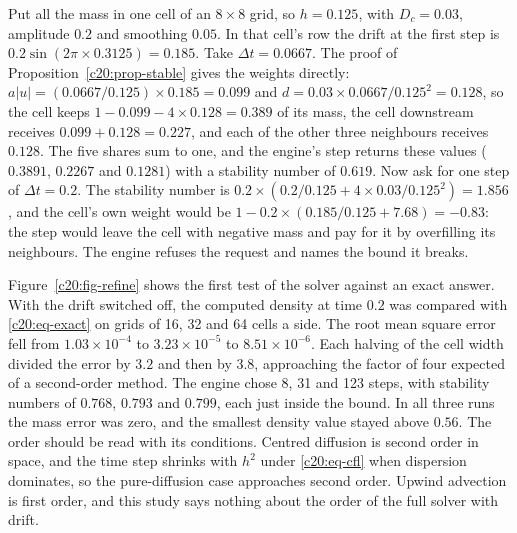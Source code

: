 \begin{example}\label{c20:ex-step}
Put all the mass in one cell of an $8\times8$ grid,
so $h=0.125$, with $D_c=0.03$, amplitude $0.2$ and smoothing $0.05$. In that cell's row the
drift at the first step is $0.2\sin(2\pi\times0.3125)=0.185$. Take $\Delta t=0.0667$. The proof of
Proposition~\ref{c20:prop-stable} gives the weights directly: $a|u|=(0.0667/0.125)\times0.185=0.099$ and
$d=0.03\times0.0667/0.125^2=0.128$, so the cell keeps $1-0.099-4\times0.128=0.389$ of its
mass, the cell downstream receives $0.099+0.128=0.227$, and each of the other three neighbours receives $0.128$. The five shares sum to one, and the engine's step returns these
values ($0.3891$, $0.2267$ and $0.1281$) with a stability number of $0.619$. Now ask for one step of $\Delta t=0.2$. The stability
number is $0.2\times(0.2/0.125+4\times0.03/0.125^2)=1.856$, and the cell's own weight would be
$1-0.2\times(0.185/0.125+7.68)=-0.83$: the step would leave the cell with negative mass
and pay for it by overfilling its neighbours. The engine refuses the request and names the
bound it breaks.
\end{example}

Figure~\ref{c20:fig-refine} shows the first test of the solver against an exact answer. With the drift
switched off, the computed density at time $0.2$ was compared with \eqref{c20:eq-exact} on grids of 16, 32
and 64 cells a side. The root mean square error fell from $1.03\times10^{-4}$ to $3.23\times10^{-5}$ to $8.51\times10^{-6}$. Each halving of the cell width divided the error by $3.2$ and then by $3.8$, approaching
the factor of four expected of a second-order method. The engine chose 8, 31 and 123 steps,
with stability numbers of $0.768$, $0.793$ and $0.799$, each just inside the bound. In all three
runs the mass error was zero, and the smallest density value stayed above $0.56$. The order
should be read with its conditions. Centred diffusion is second order in space, and the
time step shrinks with $h^2$ under \eqref{c20:eq-cfl} when dispersion dominates, so the pure-diffusion
case approaches second order. Upwind advection is first order, and this study says nothing
about the order of the full solver with drift.

